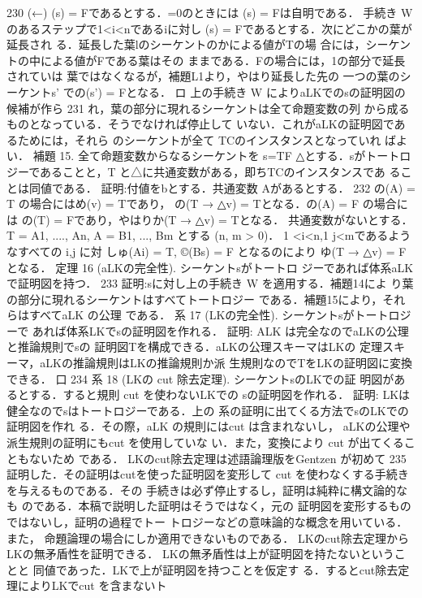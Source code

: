 \documentclass{ltjsarticle}
\theoremstyle{mystyle1}
\theoremstyle{mystyle3}
\theoremstyle{mystyle2}
\begin{document}
230
(←) (s) = Fであるとする．=0のときには
(s) = Fは自明である． 手続き W のあるステップで1<i<nであるiに対し (s) = Fであるとする．次にどこかの葉が延長され る．延長した葉lのシーケントのかによる値がTの場 合には，シーケントの中による値がFである葉はその ままである．Fの場合には，1の部分で延長されていは 葉ではなくなるが，補題L1より，やはり延長した先の 一つの葉のシーケントs' での(s') = Fとなる． ロ
上の手続き W によりaLKでのsの証明図の候補が作ら
231
れ，葉の部分に現れるシーケントは全て命題変数の列 から成るものとなっている．そうでなければ停止して いない．これがaLKの証明図であるためには，それら のシーケントが全て TCのインスタンスとなっていれ ばよい．
補題 15. 全て命題変数からなるシーケントを s=TF △とする．sがトートロジーであることと，T と△に共通変数がある，即ちTCのインスタンスであ ることは同値である．
証明:付値をbとする．共通変数 Aがあるとする．
232
の(A) = T の場合にはめ(v) = Tであり， の(T → △v) = Tとなる．の(A) = F の場合には の(T) = Fであり，やはりか(T → △v) = Tとなる． 共通変数がないとする． T = A1, ...., An, A = B1, ..., Bm とする (n, m > 0)． 1 <i<n,1 j<mであるようなすべての i,j に対 しゅ(Ai) = T, ©(Bs) = F となるのにより ゆ(T → △v) = Fとなる．
定理 16 (aLKの完全性). シーケントsがトートロ ジーであれば体系aLKで証明図を持つ．
233
証明:sに対し上の手続き W を適用する．補題14によ り葉の部分に現れるシーケントはすべてトートロジー である．補題15により，それらはすべてaLK の公理 である．
系 17 (LKの完全性). シーケントsがトートロジーで あれば体系LKでsの証明図を作れる．
証明: ALK は完全なのでaLKの公理と推論規則でsの 証明図Tを構成できる．aLKの公理スキーマはLKの 定理スキーマ，aLKの推論規則はLKの推論規則か派 生規則なのでTをLKの証明図に変換できる． 口
234
系 18 (LKの cut 除去定理). シーケントsのLKでの証 明図があるとする．すると規則 cut を使わないLKでの sの証明図を作れる．
証明: LKは健全なのでsはトートロジーである．上の 系の証明に出てくる方法でsのLKでの証明図を作れ
る．その際，aLK の規則にはcut は含まれないし， aLKの公理や派生規則の証明にもcut を使用していな い．また，変換により cut が出てくることもないため である．
LKのcut除去定理は述語論理版をGentzen が初めて
235
証明した．その証明はcutを使った証明図を変形して cut を使わなくする手続きを与えるものである．その 手続きは必ず停止するし，証明は純粋に構文論的なも のである．本稿で説明した証明はそうではなく，元の 証明図を変形するものではないし，証明の過程でトー トロジーなどの意味論的な概念を用いている．また， 命題論理の場合にしか適用できないものである． LKのcut除去定理からLKの無矛盾性を証明できる． LKの無矛盾性は上が証明図を持たないということと 同値であった．LKで上が証明図を持つことを仮定す
る．するとcut除去定理によりLKでcut を含まないト
\end{document}
